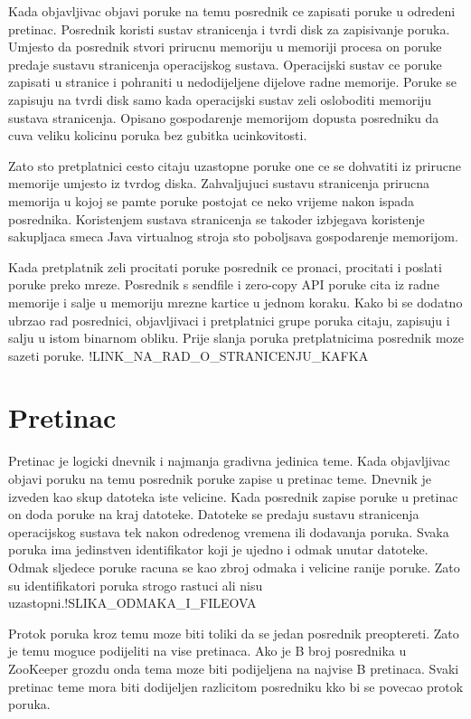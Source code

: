 \documentclass[times, utf8, diplomski, numeric]{fer}
\begin{document}
Kada objavljivac objavi poruke na temu posrednik ce zapisati poruke u odredeni pretinac. Posrednik koristi sustav stranicenja i tvrdi disk za zapisivanje poruka. Umjesto da posrednik stvori prirucnu memoriju u memoriji procesa on poruke predaje sustavu stranicenja operacijskog sustava. Operacijski sustav ce poruke zapisati u stranice i pohraniti u nedodijeljene dijelove radne memorije. Poruke se zapisuju na tvrdi disk samo kada operacijski sustav zeli osloboditi memoriju sustava stranicenja. Opisano gospodarenje memorijom dopusta posredniku da cuva veliku kolicinu poruka bez gubitka ucinkovitosti.

Zato sto pretplatnici cesto citaju uzastopne poruke one ce se dohvatiti iz prirucne memorije umjesto iz tvrdog diska. Zahvaljujuci sustavu stranicenja prirucna memorija u kojoj se pamte poruke postojat ce neko vrijeme nakon ispada posrednika. Koristenjem sustava stranicenja se takoder izbjegava koristenje sakupljaca smeca Java virtualnog stroja sto poboljsava gospodarenje memorijom.

Kada pretplatnik zeli procitati poruke posrednik ce pronaci, procitati i poslati poruke preko mreze. Posrednik s sendfile i zero-copy API poruke cita iz radne memorije i salje u memoriju mrezne kartice u jednom koraku. Kako bi se dodatno ubrzao rad posrednici, objavljivaci i pretplatnici grupe poruka citaju, zapisuju i salju u istom binarnom obliku. Prije slanja poruka pretplatnicima posrednik moze sazeti poruke. !LINK_NA_RAD_O_STRANICENJU_KAFKA 



\chapter{Pretinac}
Pretinac je logicki dnevnik i najmanja gradivna jedinica teme. Kada objavljivac objavi poruku na temu posrednik poruke zapise u pretinac teme. Dnevnik je izveden kao skup datoteka iste velicine. Kada posrednik zapise poruke u pretinac on doda poruke na kraj datoteke. Datoteke se predaju sustavu stranicenja operacijskog sustava tek nakon odredenog vremena ili dodavanja poruka. Svaka poruka ima jedinstven identifikator koji je ujedno i odmak unutar datoteke. Odmak sljedece poruke racuna se kao zbroj odmaka i velicine ranije poruke. Zato su identifikatori poruka strogo rastuci ali nisu uzastopni.!SLIKA_ODMAKA_I_FILEOVA

Protok poruka kroz temu moze biti toliki da se jedan posrednik preoptereti. Zato je temu moguce podijeliti na vise pretinaca. Ako je B broj posrednika u ZooKeeper grozdu onda tema moze biti podijeljena na najvise B pretinaca. Svaki pretinac teme mora biti dodijeljen razlicitom posredniku kko bi se povecao protok poruka.
\end{document}
